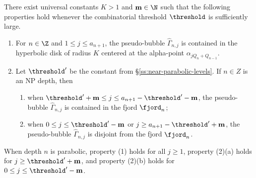 \documentclass{amsart}
\begin{document}
\begin{proposition}
\label{prop:bubble-chain-01}
    There exist universal constants $K>1$ and $\mathbf{m} \in \N$ such that the following properties hold whenever the combinatorial threshold $\threshold$ is sufficiently large.
    \begin{enumerate}
        \item For $n \in \Z$ and $1\leq j \leq a_{n+1}$, the pseudo-bubble $\hat{\Gamma}_{n,j}$ is contained in the hyperbolic disk of radius $K$ centered at the alpha-point $\alpha_{jQ_n+Q_{n-1}}$.
        \item Let $\threshold'$ be the constant from \S\ref{ss:near-parabolic-levels}. 
        If $n \in Z$ is an NP depth, then 
        \begin{enumerate}[label = \textnormal{(\alph*)}]
            \item when $\threshold' + \mathbf{m} \leq j \leq a_{n+1} -\threshold' - \mathbf{m}$, the pseudo-bubble $\hat{\Gamma}_{n,j}$ is contained in the fjord $\fjord_n$;
            \item when $0 \leq j \leq \threshold' - \mathbf{m}$ or $j \geq a_{n+1} -\threshold' + \mathbf{m}$, the pseudo-bubble $\hat{\Gamma}_{n,j}$ is disjoint from the fjord $\fjord_n$.
        \end{enumerate}
    \end{enumerate}
    When depth $n$ is parabolic, property \textnormal{(1)} holds for all $j \geq 1$, property \textnormal{(2)(a)} holds for $j \geq \threshold' + \mathbf{m}$, and property \textnormal{(2)(b)} holds for $0 \leq j \leq \threshold'-\mathbf{m}$.
\end{proposition}
\end{document}
